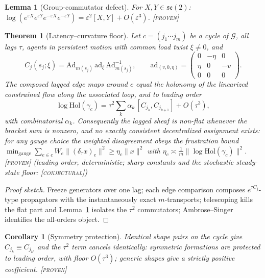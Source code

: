 \documentclass[letterpaper, 10pt, journal]{IEEEtran}
\newtheorem{theorem}{Theorem}\newtheorem{lemma}{Lemma}
\newtheorem{corollary}{Corollary}\newtheorem{definition}{Definition}
\newcommand{\provtag}{\textsc{[proven]}}
\newcommand{\conjtag}{\textsc{[conjectural]}}
\begin{document}
\begin{lemma}[Group-commutator defect]\label{lem:bchF}
For $X, Y \in \mathfrak{se}(2)$:
$\log(e^{\varepsilon X} e^{\varepsilon Y} e^{-\varepsilon X}
e^{-\varepsilon Y}) = \varepsilon^2 [X, Y] + O(\varepsilon^3)$. \provtag
\end{lemma}

\begin{theorem}[Latency--curvature floor]\label{thm:floorF}
Let $c = (j_1 \cdots j_m)$ be a cycle of $\mathcal{G}$, all lags $\tau$,
agents in persistent motion with common load twist $\xi \ne 0$, and
\[
C_j(s_j; \xi) = \mathrm{Ad}_{m(s_j)}\, \mathrm{ad}_\xi\,
\mathrm{Ad}^{-1}_{m(s_j)}, \qquad
\mathrm{ad}_{(v, 0, \eta)} = \begin{pmatrix} 0 & -\eta & 0\\ \eta & 0 & -v\\
0 & 0 & 0\end{pmatrix}.
\]
The composed lagged edge maps around $c$ equal the holonomy of the linearized
constrained flow along the associated loop, and to leading order
\[
\log \mathrm{Hol}(\gamma_c) = \tau^2 \sum_k \alpha_k\,
[C_{j_k}, C_{j_{k+1}}] + O(\tau^3),
\]
with combinatorial $\alpha_k$. Consequently the lagged sheaf is non-flat
whenever the bracket sum is nonzero, and no exactly consistent decentralized
assignment exists: for any gauge choice the weighted disagreement obeys the
frustration bound
$\min_{\mathrm{gauge}} \sum_{e \in c} W_e \|(\delta_\tau x)_e\|^2 \ge \eta_c
\|x\|^2$ with $\eta_c \asymp \tfrac{1}{m} \|\log\mathrm{Hol}(\gamma_c)\|^2$.
\provtag{} (leading order, deterministic; sharp constants and the stochastic
steady-state floor: \conjtag)
\end{theorem}
\begin{proof}[Proof sketch]
Freeze generators over one lag; each edge comparison composes
$e^{\tau C_j}$-type propagators with the instantaneously exact
$m$-transports; telescoping kills the flat part and Lemma~\ref{lem:bchF}
isolates the $\tau^2$ commutators; Ambrose--Singer identifies the all-orders
object.
\end{proof}

\begin{corollary}[Symmetry protection]\label{cor:symF}
Identical shape pairs on the cycle give $C_{j_k} \equiv C_{j_{k'}}$ and the
$\tau^2$ term cancels identically: symmetric formations are protected to
leading order, with floor $O(\tau^3)$; generic shapes give a strictly positive
coefficient. \provtag
\end{corollary}
\end{document}
